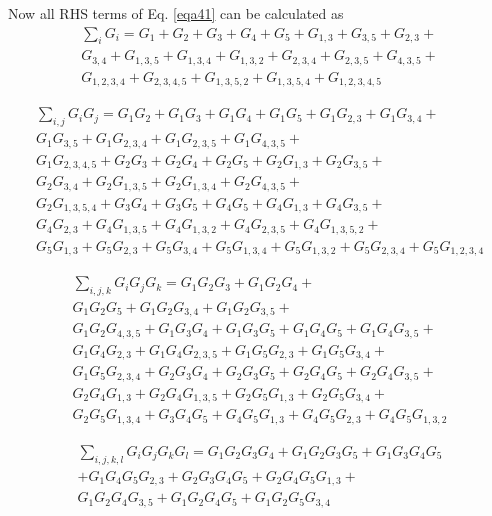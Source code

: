 \documentclass{osa-article}
\begin{document}
Now all RHS terms of Eq. \ref{eqa41} can be calculated as\\
\begin{equation}
\begin{split}
\sum_{i} {G_i}=G_1+G_2+G_3+G_4+G_5+G_{1,3}+G_{3,5}+G_{2,3}+\\G_{3,4}+G_{1,3,5}+G_{1,3,4}+G_{1,3,2}+G_{2,3,4}+G_{2,3,5}+G_{4,3,5}+\\G_{1,2,3,4}+G_{2,3,4,5}+G_{1,3,5,2}+G_{1,3,5,4}+G_{1,2,3,4,5} 
\label{eqa42}
\end{split}
\end{equation}

\begin{equation}
\begin{split}
\sum_{i,j} {G_i G_j}=G_1G_2+G_1G_3+G_1G_4+G_1G_5+G_1G_{2,3}+G_1G_{3,4}
+\\G_1G_{3,5}+G_1G_{2,3,4}+G_1G_{2,3,5}+G_1G_{4,3,5}+\\G_1G_{2,3,4,5}+G_2G_3+G_2G_4+G_2G_5+G_2G_{1,3}+G_2G_{3,5}+\\G_2G_{3,4}+G_2G_{1,3,5}+G_2G_{1,3,4}+G_2G_{4,3,5}+\\G_2G_{1,3,5,4}+G_3G_4+G_3G_5+G_4G_5+G_4G_{1,3}+G_4G_{3,5}+\\G_4G_{2,3}+G_4G_{1,3,5}+G_4G_{1,3,2}+G_4G_{2,3,5}+G_4G_{1,3,5,2}+\\G_5G_{1,3}+G_5G_{2,3}+G_5G_{3,4}+G_5G_{1,3,4}+G_5G_{1,3,2}+G_5G_{2,3,4}+G_5G_{1,2,3,4} 
\label{eqa43}
\end{split}
\end{equation}

\begin{equation}
\begin{split}
\sum_{i,j,k} {G_i G_j G_k}=G_1G_2G_3+G_1G_2G_4+\\G_1G_2G_5+G_1G_2G_{3,4}+G_1G_2G_{3,5}+\\G_1G_2G_{4,3,5}+G_1G_3G_4+G_1G_3G_5+G_1G_4G_5+G_1G_4G_{3,5}+\\G_1G_4G_{2,3}+G_1G_4G_{2,3,5}+G_1G_5G_{2,3}+G_1G_5G_{3,4}+\\G_1G_5G_{2,3,4}+G_2G_3G_4+G_2G_3G_5+G_2G_4G_5+G_2G_4G_{3,5}+\\G_2G_4G_{1,3}+G_2G_4G_{1,3,5}+G_2G_5G_{1,3}+G_2G_5G_{3,4}+\\G_2G_5G_{1,3,4}+G_3G_4G_5+G_4G_5G_{1,3}+G_4G_5G_{2,3}+G_4G_5G_{1,3,2} 
\label{eqa44}
\end{split}
\end{equation}

\begin{equation}
\begin{split}
\sum_{i,j,k,l} {G_i G_j G_kG_l}=G_1G_2G_3G_4+G_1G_2G_3G_5+G_1G_3G_4G_5\\
+G_1G_4G_5G_{2,3}+G_2G_3G_4G_5+G_2G_4G_5G_{1,3}+\\
G_1G_2G_4G_{3,5}+G_1G_2G_4G_5+G_1G_2G_5G_{3,4}
\label{eqa45}
\end{split}
\end{equation}
\end{document}
